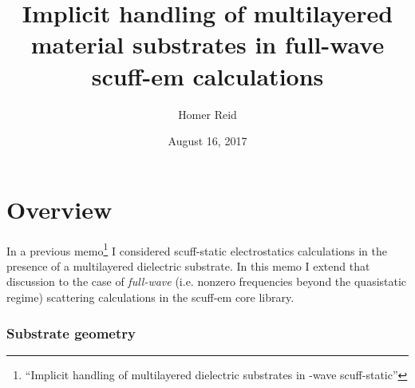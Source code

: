 \documentclass[letterpaper]{article}
\title {Implicit handling of multilayered material substrates
        in full-wave {\sc scuff-em} calculations
       }
\author {Homer Reid}
\date {August 16, 2017}
\begin{document}
\pagestyle{myheadings}

\maketitle

\tableofcontents

\newpage
\section{Overview}

In a 
previous memo\footnote{``Implicit handling of multilayered dielectric
substrates in -wave {\sc scuff-static}''} I
considered {\sc scuff-static} electrostatics calculations
in the presence of a multilayered dielectric substrate.
In this memo I extend that discussion to the case of
\textit{full-wave} (i.e. nonzero frequencies beyond the
quasistatic regime) scattering calculations in the
{\sc scuff-em} core library.

\subsubsection*{Substrate geometry}
\end{document}
